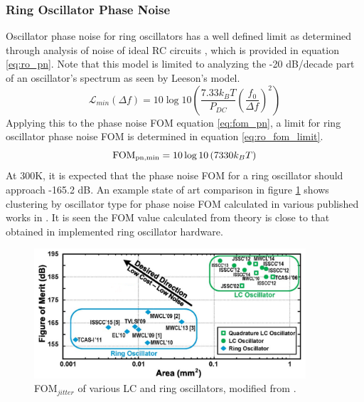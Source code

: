 	\subsubsection{Ring Oscillator Phase Noise}\label{sec:ro_pn_limit}
	Oscillator phase noise for ring oscillators has a well defined limit as determined through analysis of noise of ideal RC circuits \cite{Navid2005}, which is provided in equation \ref{eq:ro_pn}. Note that this model is limited to analyzing the -20 dB/decade part of an oscillator's spectrum as seen by Leeson's model. 
	\begin{equation}\label{eq:ro_pn}
		\mathcal{L}_{min}(\Delta f)= 10\log 10\left(\frac{7.33k_BT}{P_{DC}}\left(\frac{f_0}{\Delta f}\right)^2\right)
	\end{equation}
	Applying this to the phase noise FOM equation \ref{eq:fom_pn}, a limit for ring oscillator phase noise FOM is determined in equation \ref{eq:ro_fom_limit}.
	\begin{equation}\label{eq:ro_fom_limit}
		\textnormal{FOM}_{\textnormal{pn,min}} = 10\log 10\left(7330k_BT\right)
	\end{equation}
	At 300K, it is expected that the phase noise FOM for a ring oscillator should approach -165.2 dB. An example state of art comparison in figure \ref{fig:lc_ro_fom} shows clustering by oscillator type for phase noise FOM calculated in various published works in \cite{Tohidian2015}. It is seen the FOM value calculated from theory is close to that obtained in implemented ring oscillator hardware.
	\begin{figure}[htb!]
		\center\includegraphics[width=0.9\textwidth, angle=0]{./figs/lc_ro_fom_comparison2}
		\caption{FOM$_{jitter}$ of various LC and ring oscillators, modified from \cite{Tohidian2015}.}
		\label{fig:lc_ro_fom}
	\end{figure}

	\FloatBarrier



